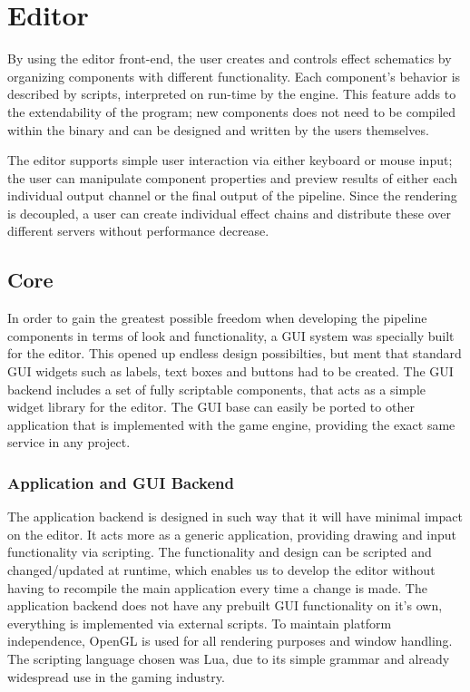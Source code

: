 
\chapter{Editor}
 
By using the editor front-end, the user creates and controls effect schematics by organizing components with different functionality. Each component’s behavior is described by scripts, interpreted on run-time by the engine. This feature adds to the extendability of the program; new components does not need to be compiled within the binary and can be designed and written by the users themselves.

The editor supports simple user interaction via either keyboard or mouse input; the user can manipulate component properties and preview results of either each individual output channel or the final output of the pipeline. Since the rendering is decoupled, a user can create individual effect chains and distribute these over different servers without performance decrease. 

\section{Core}
In order to gain the greatest possible freedom when developing the pipeline components in terms of look and functionality, a GUI system was specially built for the editor. This opened up endless design possibilties, but ment that standard GUI widgets such as labels, text boxes and buttons had to be created. The GUI backend includes a set of fully scriptable components, that acts as a simple widget library for the editor. The GUI base can easily be ported to other application that is implemented with the game engine, providing the exact same service in any project. 

\subsection{Application and GUI Backend}
The application backend is designed in such way that it will have minimal impact on the editor. It acts more as a generic application, providing drawing and input functionality via scripting. The functionality and design can be scripted and changed/updated at runtime, which enables us to develop the editor without having to recompile the main application every time a change is made. The application backend does not have any prebuilt GUI functionality on it's own, everything is implemented via external scripts. To maintain platform independence, OpenGL is used for all rendering purposes and window handling. The scripting language chosen was Lua, due to its simple grammar and already widespread use in the gaming industry.

